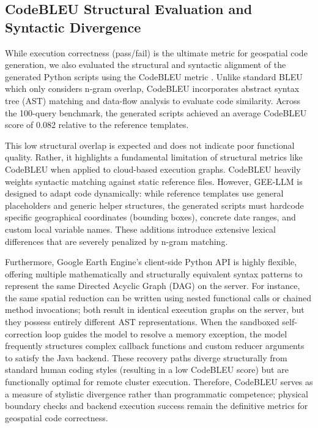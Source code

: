 \documentclass[pdflatex,sn-mathphys-ay]{sn-jnl}
\begin{document}
\subsection{CodeBLEU Structural Evaluation and Syntactic Divergence}\label{sec:res_codebleu}
While execution correctness (pass/fail) is the ultimate metric for geospatial code generation, we also evaluated the structural and syntactic alignment of the generated Python scripts using the CodeBLEU metric \citep{Ren2020}. Unlike standard BLEU which only considers n-gram overlap, CodeBLEU incorporates abstract syntax tree (AST) matching and data-flow analysis to evaluate code similarity. Across the 100-query benchmark, the generated scripts achieved an average CodeBLEU score of 0.082 relative to the reference templates.

This low structural overlap is expected and does not indicate poor functional quality. Rather, it highlights a fundamental limitation of structural metrics like CodeBLEU when applied to cloud-based execution graphs. CodeBLEU heavily weights syntactic matching against static reference files. However, GEE-LLM is designed to adapt code dynamically: while reference templates use general placeholders and generic helper structures, the generated scripts must hardcode specific geographical coordinates (bounding boxes), concrete date ranges, and custom local variable names. These additions introduce extensive lexical differences that are severely penalized by n-gram matching.

Furthermore, Google Earth Engine's client-side Python API is highly flexible, offering multiple mathematically and structurally equivalent syntax patterns to represent the same Directed Acyclic Graph (DAG) on the server. For instance, the same spatial reduction can be written using nested functional calls or chained method invocations; both result in identical execution graphs on the server, but they possess entirely different AST representations. When the sandboxed self-correction loop guides the model to resolve a memory exception, the model frequently structures complex callback functions and custom reducer arguments to satisfy the Java backend. These recovery paths diverge structurally from standard human coding styles (resulting in a low CodeBLEU score) but are functionally optimal for remote cluster execution. Therefore, CodeBLEU serves as a measure of stylistic divergence rather than programmatic competence; physical boundary checks and backend execution success remain the definitive metrics for geospatial code correctness.
\end{document}
